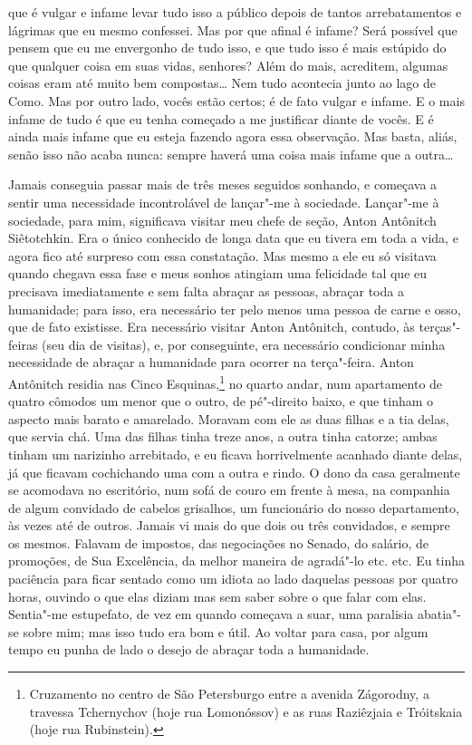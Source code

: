 que é vulgar e infame levar tudo isso a público depois de tantos
arrebatamentos e lágrimas que eu mesmo confessei. Mas por que afinal é
infame? Será possível que pensem que eu me envergonho de tudo isso, e
que tudo isso é mais estúpido do que qualquer coisa em suas vidas,
senhores? Além do mais, acreditem, algumas coisas eram até muito bem
compostas\ldots{} Nem tudo acontecia junto ao lago de Como. Mas por outro
lado, vocês estão certos; é de fato vulgar e infame. E o mais infame de
tudo é que eu tenha começado a me justificar diante de vocês. E é ainda
mais infame que eu esteja fazendo agora essa observação. Mas basta,
aliás, senão isso não acaba nunca: sempre haverá uma coisa mais infame
que a outra\ldots{}

Jamais conseguia passar mais de três meses seguidos sonhando, e começava
a sentir uma necessidade incontrolável de lançar"-me à sociedade. Lançar"-me
à sociedade, para mim, significava visitar meu chefe de seção, Anton
Antônitch Siêtotchkin. Era o único conhecido de longa data que eu
tivera em toda a vida, e agora fico até surpreso com essa constatação.
Mas mesmo a ele eu só visitava quando chegava essa fase e meus sonhos
atingiam uma felicidade tal que eu precisava imediatamente e sem falta
abraçar as pessoas, abraçar toda a humanidade; para isso, era
necessário ter pelo menos uma pessoa de carne e osso, que de fato
existisse. Era necessário visitar Anton Antônitch, contudo, às
terças"-feiras (seu dia de visitas), e, por conseguinte, era necessário
condicionar minha necessidade de abraçar a humanidade para ocorrer na
terça"-feira. Anton Antônitch residia nas Cinco Esquinas,\footnote{
Cruzamento no centro de São Petersburgo entre a avenida Zágorodny, a
travessa Tchernychov (hoje rua Lomonóssov) e as ruas Raziêzjaia e
Tróitskaia (hoje rua Rubinstein).} no quarto andar, num apartamento de
quatro cômodos um menor que o outro, de pé"-direito baixo, e que tinham
o aspecto mais barato e amarelado. Moravam com ele as duas filhas e a
tia delas, que servia chá. Uma das filhas tinha treze anos, a outra
tinha catorze; ambas tinham um narizinho arrebitado, e eu ficava
horrivelmente acanhado diante delas, já que ficavam cochichando uma com
a outra e rindo. O dono da casa geralmente se acomodava no escritório,
num sofá de couro em frente à mesa, na companhia de algum convidado de
cabelos grisalhos, um funcionário do nosso departamento, às vezes até
de outros. Jamais vi mais do que dois ou três convidados, e sempre os
mesmos. Falavam de impostos, das negociações no Senado, do salário, de
promoções, de Sua Excelência, da melhor maneira de agradá"-lo etc. etc.
Eu tinha paciência para ficar sentado como um idiota ao lado daquelas
pessoas por quatro horas, ouvindo o que elas diziam mas sem saber sobre
o que falar com elas. Sentia"-me estupefato, de vez em quando começava a
suar, uma paralisia abatia"-se sobre mim; mas isso tudo era bom e útil.
Ao voltar para casa, por algum tempo eu punha de lado o desejo de
abraçar toda a humanidade.

